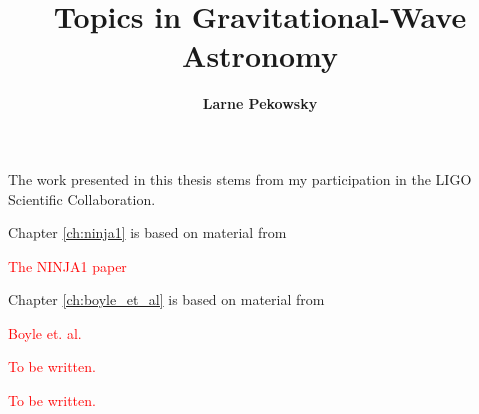 \documentclass[12pt,notitlepage]{report}
\newcommand\fake[1]{\textcolor{red}{#1}}
\begin{document}
\title{
Topics in Gravitational-Wave Astronomy
}
\author{\bf Larne Pekowsky}
\havededicationtrue
\dedication{to\\ my parents}
\haveminorfalse
\copyrighttrue
\doctoratetrue
\figurespagetrue
\tablespagetrue


\beforepreface
{}
The work presented in this thesis stems from my participation in the LIGO
Scientific Collaboration. 

\vspace*{0.5cm}

\noindent Chapter \ref{ch:ninja1} is based on material from

\vspace*{0.25cm}

\noindent \fake{The NINJA1 paper}


\vspace*{0.5cm}

\noindent Chapter \ref{ch:boyle_et_al} is based on material from

\vspace*{0.25cm}

\noindent \fake{Boyle et. al.}


\fake{To be written.}

\fake{To be written.}

\afterpreface

\label{ch:comparison}


\label{ch:ninja1}


\label{ch:detchar}


\clearpage


\end{document}
